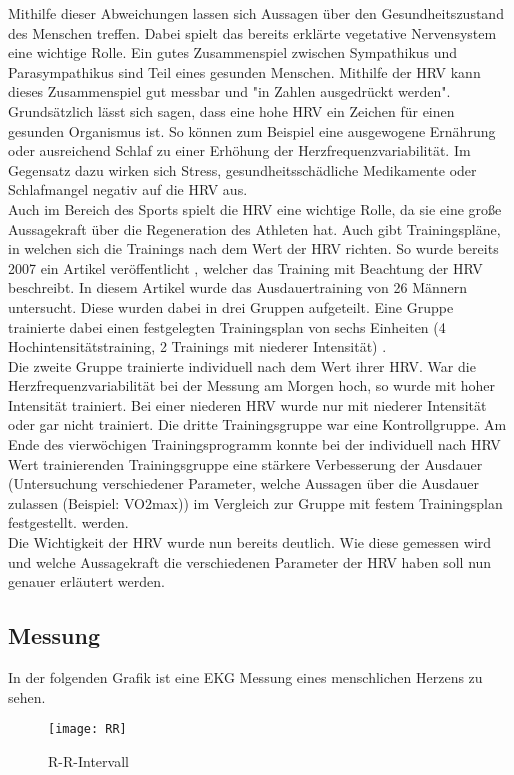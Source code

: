 Mithilfe dieser Abweichungen lassen sich Aussagen über den Gesundheitszustand des Menschen treffen. Dabei spielt das bereits erklärte vegetative Nervensystem eine wichtige Rolle. Ein gutes Zusammenspiel zwischen Sympathikus und Parasympathikus sind Teil eines gesunden Menschen. Mithilfe der HRV kann dieses Zusammenspiel gut messbar und "in Zahlen ausgedrückt werden". 
Grundsätzlich lässt sich sagen, dass eine hohe HRV ein Zeichen für einen gesunden Organismus ist. So können zum Beispiel eine ausgewogene Ernährung oder ausreichend Schlaf zu einer Erhöhung der Herzfrequenzvariabilität. Im Gegensatz dazu wirken sich Stress, gesundheitsschädliche Medikamente oder Schlafmangel negativ auf die HRV aus.\cite{hrv} \\
Auch im Bereich des Sports spielt die HRV eine wichtige Rolle, da sie eine große Aussagekraft über die Regeneration des Athleten hat. Auch gibt Trainingspläne, in welchen sich die Trainings nach dem Wert der HRV richten. So wurde bereits 2007 ein Artikel veröffentlicht \cite{sport}, welcher das Training mit Beachtung der HRV beschreibt. In diesem Artikel wurde das Ausdauertraining von 26 Männern untersucht. Diese wurden dabei in drei Gruppen aufgeteilt. Eine Gruppe trainierte dabei einen festgelegten Trainingsplan von sechs Einheiten (4 Hochintensitätstraining, 2 Trainings mit niederer Intensität) .\\
Die zweite Gruppe trainierte individuell nach dem Wert ihrer HRV. War die Herzfrequenzvariabilität bei der Messung am Morgen hoch, so wurde mit hoher Intensität trainiert. Bei einer niederen HRV wurde nur mit niederer Intensität oder gar nicht trainiert. Die dritte Trainingsgruppe war eine Kontrollgruppe. 
Am Ende des vierwöchigen Trainingsprogramm konnte bei der individuell nach HRV Wert trainierenden Trainingsgruppe eine stärkere Verbesserung der Ausdauer (Untersuchung verschiedener Parameter, welche Aussagen über die Ausdauer zulassen (Beispiel: VO2max)) im Vergleich zur Gruppe mit festem Trainingsplan festgestellt. werden.\cite{sport}\\

Die Wichtigkeit der HRV wurde nun bereits deutlich. Wie diese gemessen wird und welche Aussagekraft die verschiedenen Parameter der HRV haben soll nun genauer erläutert werden.

\subsection{Messung}
In der folgenden Grafik ist eine EKG Messung eines menschlichen Herzens zu sehen.
\begin{figure}[H]
    \centering
    \texttt{[image: RR]}
    \caption{R-R-Intervall}
    \label{fig:R-R-Intervall}
    \cite{rrbild}
\end{figure}

